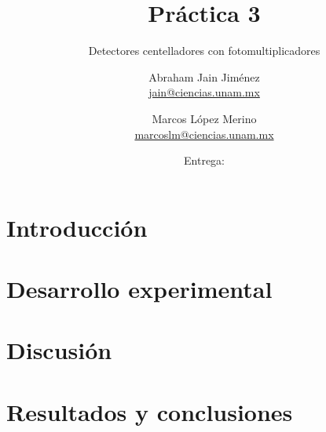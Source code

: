 \documentclass[12pt]{article}
\title{Práctica 3}
\subtitle{Detectores centelladores con fotomultiplicadores}
\author{%
    Abraham Jain Jiménez \\ \href{mailto:jain@ciencias.unam.mx}{\footnotesize jain@ciencias.unam.mx}
  \and Marcos López Merino \\ \href{mailto:marcoslm@ciencias.unam.mx}{\footnotesize marcoslm@ciencias.unam.mx}
}%
\date{Entrega: \DTMusedate{duedate}}
\begin{document}
    \maketitle
    \thispagestyle{fancy}
    \begin{abstract}
        \kant[1]
    \end{abstract}

    \section*{Introducción}
    \kant[1-2]\cite{4001NIMBins}
    
    \section*{Desarrollo experimental}
    \kant[1-2]

    \section*{Discusión}
    \kant[1-2]
    
    \section*{Resultados y conclusiones}
    \kant[1]
    
    \nocite{*} %
    \newpage
    \printbibliography
\end{document}
